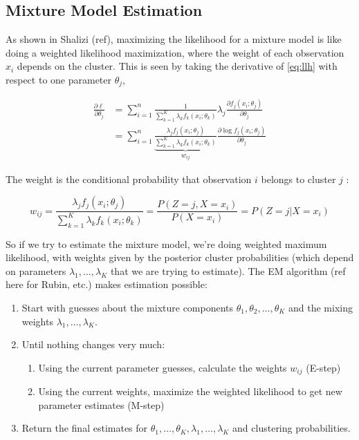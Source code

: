 \documentclass[11pt]{amsart}
\begin{document}
\subsection{Mixture Model Estimation}
As shown in Shalizi (ref), maximizing the likelihood for a mixture model is like doing a weighted likelihood maximization, where the weight of each observation $x_i$ depends on the cluster.  This is seen by taking the derivative of \eqref{eq:llh} with respect to one parameter $\theta_j$,

\begin{align*}
\frac{\partial \ell}{\partial \theta_j} &= \sum_{i=1}^n \frac{1}{\sum_{k=1}^K\lambda_k f_k(x_i; \theta_k)} \lambda_j \frac{\partial f_j(x_i;\theta_j)}{\partial \theta_j} \\
&= \sum_{i=1}^n \underbrace{\frac{\lambda_j f_j(x_i;\theta_j)}{\sum_{k=1}^K\lambda_k f_k(x_i; \theta_k)}}_{w_{ij}}  \frac{\partial \log f_j(x_i;\theta_j)}{\partial \theta_j} 
\end{align*}

The weight is the conditional probability that observation $i$ belongs to cluster $j$ :

\[w_{ij} = \frac{\lambda_j f_j(x_i;\theta_j)}{\sum_{k=1}^K\lambda_k f_k(x_i; \theta_k)} = \frac{P(Z=j, X=x_i)}{P(X=x_i)}= P(Z=j | X=x_i)\] 

So if we try to estimate the mixture model, we're doing weighted maximum likelihood, with weights given by the posterior cluster probabilities (which depend on parameters $\lambda_1,\dots,\lambda_K$ that we are trying to estimate).  The EM algorithm (ref here for Rubin, etc.) makes estimation possible: 
\begin{enumerate}
\item Start with guesses about the mixture components $\theta_1, \theta_2, \dots, \theta_K$ and the mixing weights $\lambda_1,\dots,\lambda_K$. 
\item Until nothing changes very much:
\begin{enumerate}
\item Using the current parameter guesses, calculate the weights $w_{ij}$ (E-step) 
\item Using the current weights, maximize the weighted likelihood to get new parameter estimates (M-step)
\end{enumerate}
\item Return the final estimates for $\theta_1, \dots, \theta_K, \lambda_1,\dots,\lambda_K$ and clustering probabilities. 
\end{enumerate}


\end{document}
